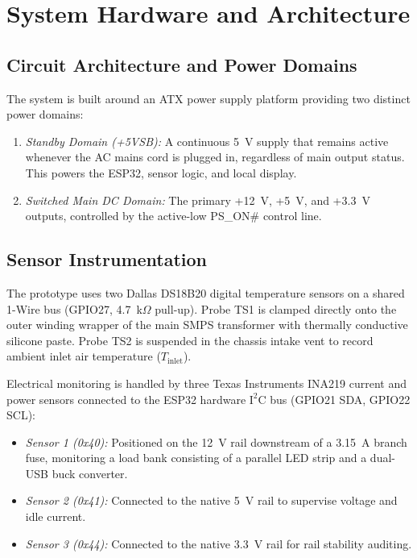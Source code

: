 \documentclass[conference]{IEEEtran}
\begin{document}
\section{System Hardware and Architecture}

\subsection{Circuit Architecture and Power Domains}
The system is built around an ATX power supply platform providing two distinct power domains:
\begin{enumerate}
    \item \textit{Standby Domain (+5VSB):} A continuous 5~V supply that remains active whenever the AC mains cord is plugged in, regardless of main output status. This powers the ESP32, sensor logic, and local display.
    \item \textit{Switched Main DC Domain:} The primary +12~V, +5~V, and +3.3~V outputs, controlled by the active-low PS\_ON\# control line.
\end{enumerate}

\subsection{Sensor Instrumentation}
The prototype uses two Dallas DS18B20 digital temperature sensors on a shared 1-Wire bus (GPIO27, 4.7~k$\Omega$ pull-up). Probe TS1 is clamped directly onto the outer winding wrapper of the main SMPS transformer with thermally conductive silicone paste. Probe TS2 is suspended in the chassis intake vent to record ambient inlet air temperature ($T_{\text{inlet}}$).

Electrical monitoring is handled by three Texas Instruments INA219 current and power sensors connected to the ESP32 hardware $\text{I}^2\text{C}$ bus (GPIO21 SDA, GPIO22 SCL):
\begin{itemize}
    \item \textit{Sensor 1 (0x40):} Positioned on the 12~V rail downstream of a 3.15~A branch fuse, monitoring a load bank consisting of a parallel LED strip and a dual-USB buck converter.
    \item \textit{Sensor 2 (0x41):} Connected to the native 5~V rail to supervise voltage and idle current.
    \item \textit{Sensor 3 (0x44):} Connected to the native 3.3~V rail for rail stability auditing.
\end{itemize}
\end{document}
